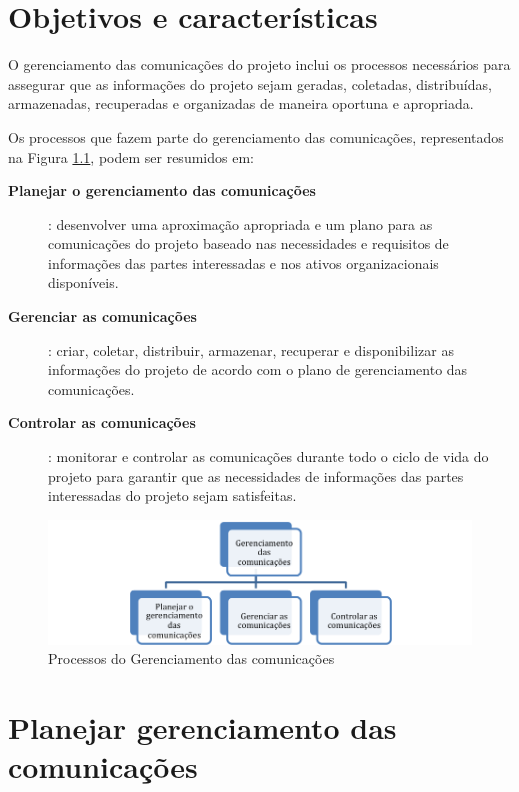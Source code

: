 \chapter{Objetivos e características}

O gerenciamento das comunicações do projeto inclui os processos necessários para assegurar que as informações do projeto sejam geradas, coletadas, distribuídas, armazenadas, recuperadas e organizadas de maneira oportuna e apropriada.

Os processos que fazem parte do gerenciamento das comunicações, representados na Figura \ref{fig:proc:ger:comunic}, podem ser resumidos em:

\begin{description}
	
	\item[\textbf{Planejar o gerenciamento das comunicações}]: desenvolver uma aproximação apropriada e um plano para as comunicações do projeto baseado nas necessidades e requisitos de informações das partes interessadas e nos ativos organizacionais disponíveis.
	
	\item[\textbf{Gerenciar as comunicações}]: criar, coletar, distribuir, armazenar, recuperar e disponibilizar as informações do projeto de acordo com o plano de gerenciamento das comunicações.
	
	\item[\textbf{Controlar as comunicações}]: monitorar e controlar as comunicações durante todo o ciclo de vida do projeto para garantir que as necessidades de informações das partes interessadas do projeto sejam satisfeitas.

\end{description}

\begin{figure}[!h]
	\centering
	\includegraphics[scale=0.75]{Figuras/gerenciamento_comunicacoes.png}
	\caption{Processos do Gerenciamento das comunicações}
	\label{fig:proc:ger:comunic}
\end{figure}

\chapter{Planejar gerenciamento das comunicações}

